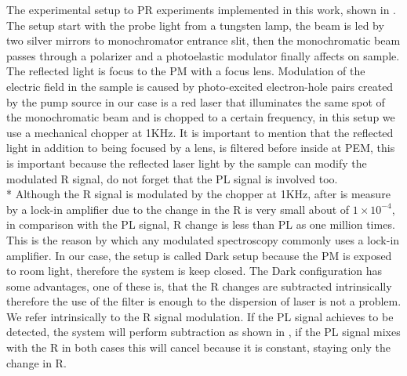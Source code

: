 The experimental setup to PR experiments implemented in this work, shown in . The setup start with the probe light from a tungsten lamp, the beam is led by two silver mirrors to monochromator entrance slit, then the monochromatic beam passes through a polarizer and a photoelastic modulator finally affects on sample. The reflected light is focus to the PM with a focus lens. Modulation of the electric field in the sample is caused by photo-excited electron-hole pairs created by the pump source in our case is a red laser that illuminates the same spot of the monochromatic beam and is chopped to a certain frequency, in this setup we use a mechanical chopper at 1KHz. It is important to mention that the reflected light in addition to being  focused by a lens, is filtered before inside at PEM, this is important because the reflected laser light by the sample can modify the modulated R signal, do not forget that the PL signal is involved too. \\*
Although the \gls{R} signal is modulated by the chopper at 1KHz, after is measure by a lock-in amplifier due to the change in the R is very small about of  $1\times 10^{-4}$,  in comparison with the  PL signal, R change is less than PL as one million times. This is the reason by which any modulated spectroscopy commonly uses a lock-in amplifier. In our case, the setup is called Dark\cite{misiewicz1999photoreflectance} setup because the PM is exposed to room light, therefore the system is keep closed. The  Dark configuration has some advantages, one of these is, that the R changes are subtracted intrinsically therefore the use of the filter is enough to the dispersion of laser is not a problem.  We refer intrinsically to the R signal modulation. If the PL signal achieves to be detected,  the system will perform subtraction as shown in , if the PL signal mixes with the R in both cases this will cancel because it is constant,  staying only the change in R. 
